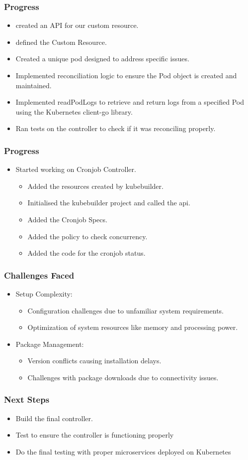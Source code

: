 \documentclass{beamer}
\begin{document}
\begin{frame}
    \frametitle{Progress}
\begin{itemize}
    \item created an API for our custom resource.
    \item defined the Custom Resource.
    \item Created a unique pod designed to address specific issues.
    \item Implemented reconciliation logic to ensure the Pod object is created and maintained.
    \item Implemented readPodLogs to retrieve and return logs from a specified Pod using the Kubernetes client-go library.
    \item Ran tests on the controller to check if it was reconciling properly.
\end{itemize}
\end{frame}
\begin{frame}
    \frametitle{Progress}
\begin{itemize}
    \item Started working on Cronjob Controller.
    \begin{itemize}
        \item Added the resources created by kubebuilder.
        \item Initialised the kubebuilder project and called the api.
        \item Added the Cronjob Specs.
        \item Added the policy to check concurrency.
        \item Added the code for the cronjob status.
    \end{itemize}
\end{itemize}
\end{frame}

\begin{frame}
    \frametitle{Challenges Faced}
    \begin{itemize}
    \item Setup Complexity:
    \begin{itemize}
        \item Configuration challenges due to unfamiliar system requirements.
        \item Optimization of system resources like memory and processing power.
    \end{itemize}
    \item Package Management:
    \begin{itemize}
        \item Version conflicts causing installation delays.
        \item Challenges with package downloads due to connectivity issues.
    \end{itemize}
    \end{itemize}
\end{frame}

\begin{frame}
    \frametitle{Next Steps}
\begin{itemize}
        \item Build the final controller.
        \item Test to ensure the controller is functioning properly
        \item Do the final testing with proper microservices deployed on Kubernetes
\end{itemize}
\end{frame}
\end{document}
